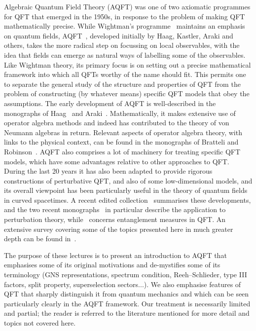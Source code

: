 \documentclass[12pt,a4paper]{article}
\newcommand{\1}{\mathds{1}}                         %
\begin{document}
	Algebraic Quantum Field Theory (AQFT) was one of two axiomatic programmes for QFT that emerged in the 1950s, in response to the problem of making QFT mathematically precise.
	While Wightman's programme~\cite{StreaterWightman} maintains an emphasis on quantum fields, AQFT~\cite{Haag,Araki}, developed initially by Haag, Kastler, Araki and others, takes the more radical step on focussing on local observables, with the idea that fields can emerge as natural ways of labelling some of the observables. Like Wightman theory, its primary focus is on setting out a precise mathematical framework into which all QFTs worthy of the name should fit. This permits one to separate the general study of the structure and properties of QFT from the problem of constructing (by whatever means) specific QFT models that obey the assumptions. 
	The early development of AQFT is well-described in the monographs of Haag~\cite{Haag} and Araki~\cite{Araki}. Mathematically, it makes extensive use of operator algebra methods and indeed has contributed to the theory of von Neumann algebras in return. Relevant aspects of operator algebra theory, with links to the physical context, can be found in the monographs of Bratteli and Robinson~\cite{BratRob:vol1,BratRob:vol2}.
	AQFT also comprises a lot of machinery for treating specific QFT models, which have some advantages relative to other approaches to QFT. 
	During the last 20 years it has also been adapted to provide rigorous constructions of perturbative QFT, and also of some low-dimensional models, and its overall viewpoint
	has been particularly useful in the theory of quantum fields in curved spacetimes. A recent edited collection~\cite{AdvAQFT} summarises these developments, and the two recent monographs~\cite{Rejzner_book,duetsch2019classical} in particular describe the application to perturbation theory, while~\cite{hollands2018entanglement} concerns entanglement measures in QFT. An extensive survey covering some of the topics presented here in much greater depth can be found in~\cite{HalvorsenMueger:2006}.
	
	The purpose of these lectures is to present an introduction to AQFT
	that emphasises some of its original motivations and de-mystifies some of its terminology (GNS representations, spectrum condition, Reeh--Schlieder, type III factors, split property, superselection sectors...). We also emphasise features of QFT that sharply distinguish it from quantum mechanics and which can be seen particularly clearly in the AQFT framework. Our treatment is necessarily limited and partial; the reader is referred to the literature mentioned for more detail and topics not covered here. 
	
\end{document}
